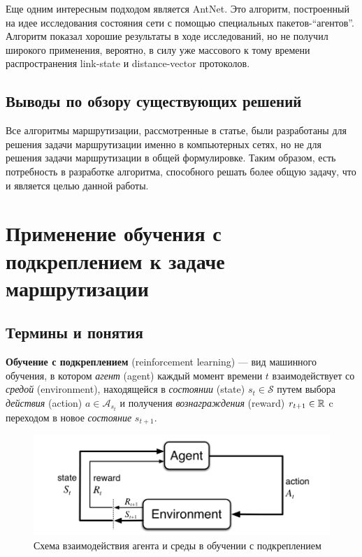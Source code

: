 \documentclass[]{itmo-student-thesis}
\begin{document}
Еще одним интересным подходом является AntNet\cite{di1998antnet}. Это алгоритм,
построенный на идее исследования состояния сети с помощью специальных
пакетов-``агентов''. Алгоритм показал хорошие результаты в ходе исследований, но
не получил широкого применения, вероятно, в силу уже массового к тому времени
распространения link-state и distance-vector протоколов.

\subsection{Выводы по обзору существующих решений}

Все алгоритмы маршрутизации, рассмотренные в статье, были разработаны для
решения задачи маршрутизации именно в компьютерных сетях, но не для решения
задачи маршрутизации в общей формулировке. Таким образом, есть потребность в
разработке алгоритма, способного решать более общую задачу, что и является целью
данной работы.

\section{Применение обучения с подкреплением к задаче маршрутизации}

\subsection{Термины и понятия}

\textbf{Обучение с подкреплением} (reinforcement learning) --- вид машинного
обучения, в котором \textit{агент} (agent) каждый момент времени $t$
взаимодействует со \textit{средой} (environment), находящейся в
\textit{состоянии} (state) $s_t \in \mathcal{S}$ путем выбора
\textit{действия} (action) $a \in \mathcal{A}_{s_t}$ и получения
\textit{вознаграждения} (reward) $r_{t+1} \in \Bbb{R}$ c переходом в новое
\textit{состояние} $s_{t+1}$.

\begin{figure}[!h]
  \caption{Схема взаимодействия агента и среды в обучении с подкреплением}\label{rl-scheme}
  \centering
  \includegraphics[scale=0.5]{rl-scheme}
\end{figure}
\end{document}
